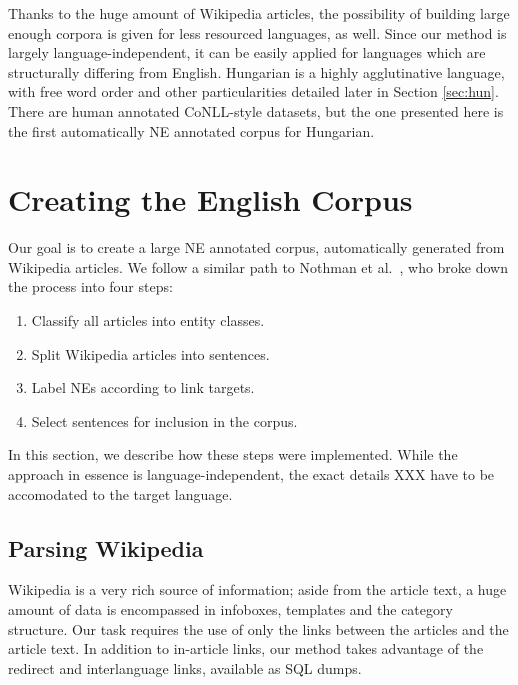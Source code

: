 \documentclass[11pt]{article}
\begin{document}
Thanks to the huge amount of Wikipedia articles, the possibility of building large enough 
corpora is given for less resourced languages, as well. Since our method is largely language-independent, it can be easily applied for languages which are structurally differing from English. Hungarian is a highly agglutinative language, with free word order and other particularities detailed later in Section \ref{sec:hun}. There are human annotated CoNLL-style datasets, but the one presented here is the first automatically NE annotated corpus for Hungarian.

\section{Creating the English Corpus} 
\label{sec:create}

Our goal is to create a large NE annotated corpus, automatically generated from Wikipedia articles. We follow a similar path to Nothman et al.~, who broke down the process into four steps:

\begin{enumerate}
\item Classify all articles into entity classes.
\item Split Wikipedia articles into sentences.
\item Label NEs according to link targets.
\item Select sentences for inclusion in the corpus.
\end{enumerate}


In this section, we describe how these steps were implemented. While the approach in essence is language-independent, the exact details XXX have to be accomodated to the target language. 


\subsection{Parsing Wikipedia}

Wikipedia is a very rich source of information; aside from the article text, a huge amount of data is encompassed in infoboxes, templates and the category structure. Our task requires the use of only the links between the articles and the article text. In addition to in-article links, our method takes advantage of the redirect and interlanguage links, available as SQL dumps.
\end{document}
